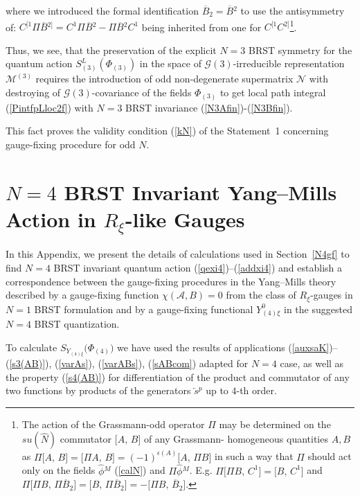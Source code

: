 \documentclass[10pt]{article}
\renewcommand{\theequation}{\thesection.\arabic{equation}}
\begin{document}
where we introduced  the formal identification $\overline{B}_{2}=\overline{B}{}^{2}$ to use the  antisymmetry  of: $C^{[1} \Pi\overline{B}{}^{2]} = C^{1}\Pi\overline{B}{}^{2} - \Pi\overline{B}{}^{2}C^{1}$ being inherited from one for  $C^{[1} C^{2]}$\footnote{The action of the Grassmann-odd  operator $\Pi$ may be determined on the $su(\hat{N})$ commutator $\big[A,\,B \big]$ of any Grassmann- homogeneous quantities  $A, B$  as $\Pi\big[A,\,B \big]=\big[\Pi A,\,B \big] =(-1)^{\epsilon(A)}\big[A,\,\Pi B \big]$ in such a way that $\Pi $ should act only on the  fields $\widehat{\phi}{}^M$ (\ref{calN}) and $\Pi\widehat{\phi}{}^M$. E.g.
$\Pi\big[\Pi{B},\,C^1\big] = \big[{B},\,C^1\big]$ and $\Pi\big[\Pi{B},\, \Pi \overline{B}_2\big]=\big[{B},\, \Pi \overline{B}_2\big]=-\big[\Pi{B},\,  \overline{B}_2\big]$.}.

Thus, we see, that the preservation of the explicit $N=3$ BRST symmetry for the quantum action $S^L_{(3)}(\Phi_{(3)})$ in the space of $\mathcal{G}(3)$-irreducible representation $\mathcal{M}^{(3)}$ requires the introduction of odd non-degenerate supermatrix $\mathcal{N}$ with destroying of $\mathcal{G}(3)$-covariance of the fields $\Phi_{(3)}$  to get local  path integral (\ref{PintfpLloc2f}) with  $N=3$ BRST invariance (\ref{N3Afin})-(\ref{N3Bfin}).

This fact proves the validity condition (\ref{kN}) of the Statement~1 concerning gauge-fixing procedure for odd $N$.

\section{$N=4$ BRST Invariant Yang--Mills Action in $R_{\xi}$-like Gauges}

\label{AppB} \renewcommand{\theequation}{\Alph{section}.\arabic{equation}} \setcounter{equation}{0}

In this Appendix, we present the details of calculations used in
Section~\ref{N4gf} to find $N=4$ BRST invariant quantum  action  (\ref{qexi4})--(\ref{addxi4})  and
establish a correspondence between the gauge-fixing
procedures in the Yang--Mills theory described by a gauge-fixing function
$\chi(\mathcal{A},B) = 0$ from the class of $R_{\xi}$-gauges in  $N=1$ BRST formulation and by a gauge-fixing functional $Y^0_{(4)\xi}$ in the suggested $N=4$ BRST
quantization.

To calculate $ S_{Y_{(4)\xi}}\big({\Phi}_{(4)}\big)$ we have used the results of applications  (\ref{auxsaK})--(\ref{s3(AB)}),  (\ref{varAs}), (\ref{varABs}),  (\ref{sABcom})  adapted for $N=4$ case, as well as the property (\ref{s4(AB)}) for differentiation of the product and commutator of any two functions by products of the generators $\overleftarrow{s}{}^p$ up to $4$-th order.
\end{document}
